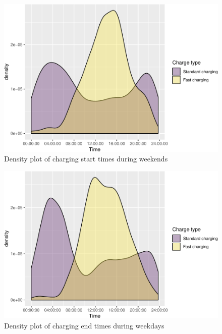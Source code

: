 \documentclass[]{article}
\newenvironment{Shaded}{\begin{snugshade}}{\end{snugshade}}
\newcommand{\KeywordTok}[1]{\textcolor[rgb]{0.13,0.29,0.53}{\textbf{#1}}}
\newcommand{\DataTypeTok}[1]{\textcolor[rgb]{0.13,0.29,0.53}{#1}}
\newcommand{\FloatTok}[1]{\textcolor[rgb]{0.00,0.00,0.81}{#1}}
\newcommand{\StringTok}[1]{\textcolor[rgb]{0.31,0.60,0.02}{#1}}
\newcommand{\OperatorTok}[1]{\textcolor[rgb]{0.81,0.36,0.00}{\textbf{#1}}}
\newcommand{\NormalTok}[1]{#1}
\begin{document}
\begin{figure}
\centering
\includegraphics{EVBB_SummaryReport_files/figure-latex/chargeBeginsWeekend-1.pdf}
\caption{\label{fig:chargeBeginsWeekend}Density plot of charging start times
during weekends}
\end{figure}

\begin{Shaded}
\end{Shaded}

\begin{figure}
\centering
\includegraphics{EVBB_SummaryReport_files/figure-latex/chargeEndsWeekday-1.pdf}
\caption{\label{fig:chargeEndsWeekday}Density plot of charging end times
during weekdays}
\end{figure}
\end{document}
